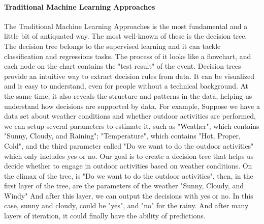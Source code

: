 \documentclass[12pt]{article}
\begin{document}
\paragraph{Traditional Machine Learning Approaches}
The Traditional Machine Learning Approaches is the most fundamental and a little bit of antiquated way. The most well-known of these is the decision tree. The decision tree belongs to the supervised learning and it can tackle classification and regressions tasks. The process of it looks like a flowchart, and each node on the chart contains the "test result" of the event. Decision trees provide an intuitive way to extract decision rules from data. It can be visualized and is easy to understand, even for people without a technical background. At the same time, it also reveals the structure and patterns in the data, helping us understand how decisions are supported by data. For example, Suppose we have a data set about weather conditions and whether outdoor activities are performed, we can setup several parameters to estimate it, such as "Weather", which contains "Sunny, Cloudy, and Raining"; "Temperature", which contains "Hot, Proper, Cold", and the third parameter called "Do we want to do the outdoor activities" which only includes yes or no. Our goal is to create a decision tree that helps us decide whether to engage in outdoor activities based on weather conditions. On the climax of the tree, is "Do we want to do the outdoor activities", then, in the first layer of the tree, are the parameters of the weather "Sunny, Cloudy, and Windy" And after this layer, we can output the decisions with yes or no. In this case, sunny and cloudy, could be "yes", and "no" for the rainy. And after many layers of iteration, it could finally have the ability of predictions.
\end{document}
